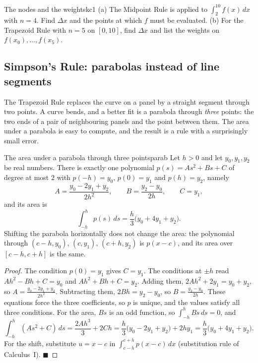 \documentclass[11pt]{article}
\begin{document}
\begin{kc}{The nodes and the weights}{kc1}
(a) The Midpoint Rule is applied to $\int_2^{10}f(x)\,dx$ with $n=4$. Find $\Delta x$ and the points at which $f$ must be evaluated. (b) For the Trapezoid Rule with $n=5$ on $[0,10]$, find $\Delta x$ and list the weights on $f(x_0),\ldots,f(x_5)$.
\end{kc}

\subsection*{Simpson's Rule: parabolas instead of line segments}

The Trapezoid Rule replaces the curve on a panel by a straight segment through two points. A curve bends, and a better fit is a parabola through \emph{three} points: the two ends of a pair of neighbouring panels and the point between them. The area under a parabola is easy to compute, and the result is a rule with a surprisingly small error.

\begin{thm}{The area under a parabola through three points}{parab}
Let $h>0$ and let $y_0,y_1,y_2$ be real numbers. There is exactly one polynomial $p(s)=As^2+Bs+C$ of degree at most $2$ with $p(-h)=y_0$, $p(0)=y_1$ and $p(h)=y_2$, namely
\[A=\frac{y_0-2y_1+y_2}{2h^2},\qquad B=\frac{y_2-y_0}{2h},\qquad C=y_1,\]
and its area is
\[\int_{-h}^hp(s)\,ds=\frac h3\big(y_0+4y_1+y_2\big).\]
Shifting the parabola horizontally does not change the area: the polynomial through $(c-h,y_0)$, $(c,y_1)$, $(c+h,y_2)$ is $p(x-c)$, and its area over $[c-h,c+h]$ is the same.
\end{thm}
\begin{proof}
The condition $p(0)=y_1$ gives $C=y_1$. The conditions at $\pm h$ read $Ah^2-Bh+C=y_0$ and $Ah^2+Bh+C=y_2$. Adding them, $2Ah^2+2y_1=y_0+y_2$, so $A=\frac{y_0-2y_1+y_2}{2h^2}$. Subtracting them, $2Bh=y_2-y_0$, so $B=\frac{y_2-y_0}{2h}$. These equations force the three coefficients, so $p$ is unique, and the values satisfy all three conditions. For the area, $Bs$ is an odd function, so $\int_{-h}^hBs\,ds=0$, and
\[\int_{-h}^h(As^2+C)\,ds=\frac{2Ah^3}3+2Ch=\frac h3\big(y_0-2y_1+y_2\big)+2hy_1=\frac h3\big(y_0+4y_1+y_2\big).\]
For the shift, substitute $u=x-c$ in $\int_{c-h}^{c+h}p(x-c)\,dx$ (substitution rule of Calculus~I). $\blacksquare$
\end{proof}
\end{document}
